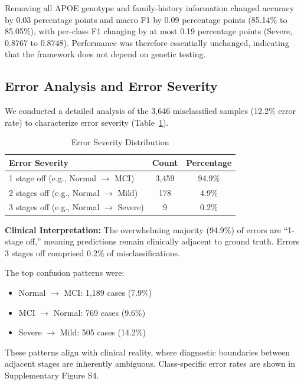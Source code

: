 \documentclass[preprint,12pt]{elsarticle}
\begin{document}
Removing all APOE genotype and family-history information changed accuracy by 0.03 percentage points and macro F1 by 0.09 percentage points (85.14\% to 85.05\%), with per-class F1 changing by at most 0.19 percentage points (Severe, 0.8767 to 0.8748). Performance was therefore essentially unchanged, indicating that the framework does not depend on genetic testing.

\subsection{Error Analysis and Error Severity}

We conducted a detailed analysis of the 3,646 misclassified samples (12.2\% error rate) to characterize error severity (Table~\ref{tab:errors}).

\begin{table}[htbp]
\caption{Error Severity Distribution}
\label{tab:errors}
\begin{center}
\begin{tabular}{lcc}
\toprule
\textbf{Error Severity} & \textbf{Count} & \textbf{Percentage} \\
\midrule
1 stage off (e.g., Normal $\rightarrow$ MCI) & 3,459 & 94.9\% \\
2 stages off (e.g., Normal $\rightarrow$ Mild) & 178 & 4.9\% \\
3 stages off (e.g., Normal $\rightarrow$ Severe) & 9 & 0.2\% \\
\bottomrule
\end{tabular}
\end{center}
\end{table}

\textbf{Clinical Interpretation:} The overwhelming majority (94.9\%) of errors are ``1-stage off,'' meaning predictions remain clinically adjacent to ground truth. Errors 3 stages off comprised 0.2\% of misclassifications.

The top confusion patterns were:
\begin{itemize}
    \item Normal $\rightarrow$ MCI: 1,189 cases (7.9\%)
    \item MCI $\rightarrow$ Normal: 769 cases (9.6\%)
    \item Severe $\rightarrow$ Mild: 505 cases (14.2\%)
\end{itemize}

These patterns align with clinical reality, where diagnostic boundaries between adjacent stages are inherently ambiguous. Class-specific error rates are shown in Supplementary Figure S4.
\end{document}
